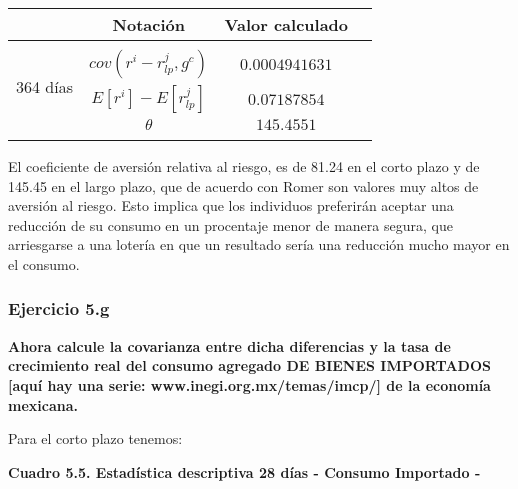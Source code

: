 \documentclass[
]{article}
\begin{document}
\begin{table}[h!]
                \begin{center} 
                    \begin{tabular}{|c|c|c|c|} 
                        \hline 
                        \mbox{}\;\;\;\;\;\mbox{}& \; Notación\;  & \; Valor calculado\; \\ 
                        \hline 
                        \multirow{4}{*}{\begin{sideways}364 días\end{sideways}} 
                        &  &   \\
                        &$cov(r^i-r_{lp}^j, g^c)$  & $0.0004941631$ \\
                        &$E[r^i]-E[r^j_{lp}]$ & $0.07187854$ \\ 
                        &$\theta$ & $145.4551$ \\ 
                        &  &   \\
                        \hline \hline
                        \hline
                    \end{tabular}
                \end{center}
\end{table}

El coeficiente de aversión relativa al riesgo, es de 81.24 en el corto
plazo y de 145.45 en el largo plazo, que de acuerdo con Romer son
valores muy altos de aversión al riesgo. Esto implica que los individuos
preferirán aceptar una reducción de su consumo en un procentaje menor de
manera segura, que arriesgarse a una lotería en que un resultado sería
una reducción mucho mayor en el consumo.

\newpage

\hypertarget{ejercicio-5.g}{%
\subsubsection{Ejercicio 5.g}\label{ejercicio-5.g}}

\textbf{Ahora calcule la covarianza entre dicha diferencias y la tasa de
crecimiento real del consumo agregado DE BIENES IMPORTADOS {[}aquí hay
una serie: www.inegi.org.mx/temas/imcp/{]} de la economía mexicana.}

Para el corto plazo tenemos:

\begin{center}
\textbf{Cuadro 5.5. Estadística descriptiva 28 días - Consumo Importado -}
\end{center}
\end{document}
